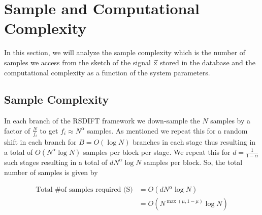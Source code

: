 \section{Sample and Computational Complexity}
\label{Sec:Complexity}
In this section, we will analyze the sample complexity which is the  number of samples we access from the sketch of the signal $\vec{\mathrm{x}}$ stored in the database and the computational complexity as a function of the system parameters.

\subsection{\bf Sample Complexity}
In each branch of the RSDIFT framework we down-sample the $N$ samples by a factor of $\frac{N}{f_i}$ to get $f_i\approx N^{\alpha}$ samples. As mentioned we repeat this for a random shift in each branch for $B=O(\log N)$ branches in each stage thus resulting in a total of $O(N^{\alpha}\log N)$ samples per block per stage. We repeat this for $d = \frac{1}{1-\alpha}$ such stages resulting in a total of $dN^{\alpha}\log N$ samples per block. So, the total number of samples is given by  

\begin{align*}
\text{Total \# of samples required (S)} &= O \left(dN^{\alpha}\log N\right)\\
   &=   O(N^{\max(\mu,1-\mu)}\log N)
\end{align*}




